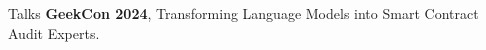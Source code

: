 \begin{rubric}{Talks}
\entry*[2024] \textbf{GeekCon 2024}, Transforming Language Models into Smart Contract Audit Experts.
\end{rubric}